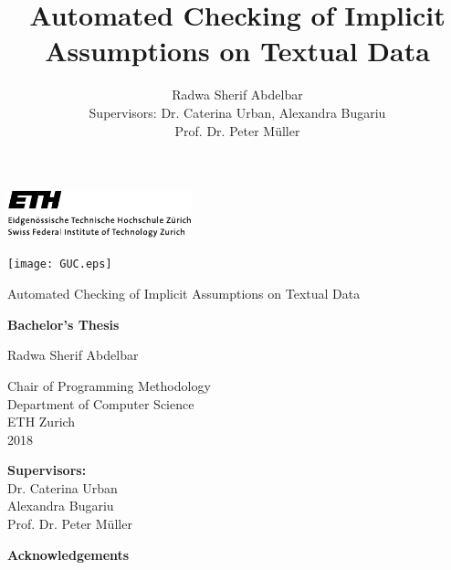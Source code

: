 \documentclass[10pt]{report}
\title{Automated Checking of Implicit Assumptions on Textual Data }
\author{Radwa Sherif Abdelbar \\
	 Supervisors: Dr. Caterina Urban, Alexandra Bugariu \\ Prof. Dr. Peter M{\"u}ller}
\begin{document}
\begin{titlepage}
	\begin{center}
		

		\begin{flushleft}
		\includegraphics[width=0.4\textwidth]{ETHlogo.pdf}	
		\end{flushleft}
		\vspace*{-1.5cm}
		\begin{flushright}
			\texttt{[image: GUC.eps]}
		\end{flushright}
		\vspace*{1.5cm}		
		\LARGE{Automated Checking of Implicit Assumptions on Textual Data }
		
		\vspace{0.8cm}
		\normalsize{\textbf{Bachelor's Thesis}}
		
		\vspace{1.5cm}
		
		Radwa Sherif Abdelbar
		
		
	
		
		\vspace{2cm}
		
		
		Chair of Programming Methodology\\
		Department of Computer Science\\
		ETH Zurich\\
		2018
		
		\vfill
		\textbf{Supervisors:}\\
		Dr. Caterina Urban \\
		Alexandra Bugariu \\
		Prof. Dr. Peter M{\"u}ller
		
	\end{center}
\end{titlepage}
\pagebreak
\thispagestyle{empty}
\vspace*{10cm}
\begin{flushright}
\end{flushright}

\pagebreak
\thispagestyle{empty}
\begin{center}
	\large{\textbf{Acknowledgements}} \\
\end{center}
%
\end{document}
